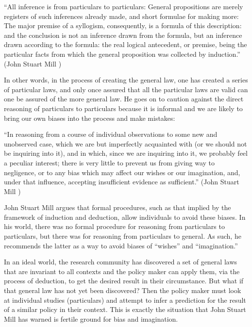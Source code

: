 \documentclass[a4paper,12pt]{article}
\begin{document}
\begin{displayquote}
  ``All inference is from particulars to particulars: General propositions are merely registers of such inferences already made, and short formulae for making more: The major premise of a syllogism, consequently, is a formula of this description: and the conclusion is not an inference drawn from the formula, but an inference drawn according to the formula: the real logical antecedent, or premise, being the particular facts from which the general proposition was collected by induction.''  (John Stuart Mill  )
\end{displayquote}

In other words, in the process of creating the general law, one has created a series of particular laws, and only once assured that all the particular laws are valid can one be assured of the more general law. He goes on to caution against the direct reasoning of particulars to particulars because it is informal and we are likely to bring our own biases into the process and make mistakes:
%
\begin{displayquote}
``In reasoning from a course of individual observations to some new and unobserved case, which we are but imperfectly acquainted with (or we should not be inquiring into it), and in which, since we are inquiring into it, we probably feel a peculiar interest; there is very little to prevent us from giving way to negligence, or to any bias which may affect our wishes or our imagination, and, under that influence, accepting insufficient evidence as sufficient.'' (John Stuart Mill )
\end{displayquote}

John Stuart Mill argues that formal procedures, such as that implied by the framework of induction and deduction, allow individuals to avoid these biases. In his world, there was no formal procedure for reasoning from particulars to particulars, but there was for reasoning from particulars to general. As such, he recommends the latter as a way to avoid biases of ``wishes'' and ``imagination.''

In an ideal world, the research community has discovered a set of general laws that are invariant to all contexts and the policy maker can apply them, via the process of deduction, to get the desired result in their circumstance. But what if that general law has not yet been discovered? Then the policy maker must look at individual studies (particulars) and attempt to infer a prediction for the result of a similar policy in their context. This is exactly the situation that John Stuart Mill has warned is fertile ground for bias and imagination.
\end{document}
